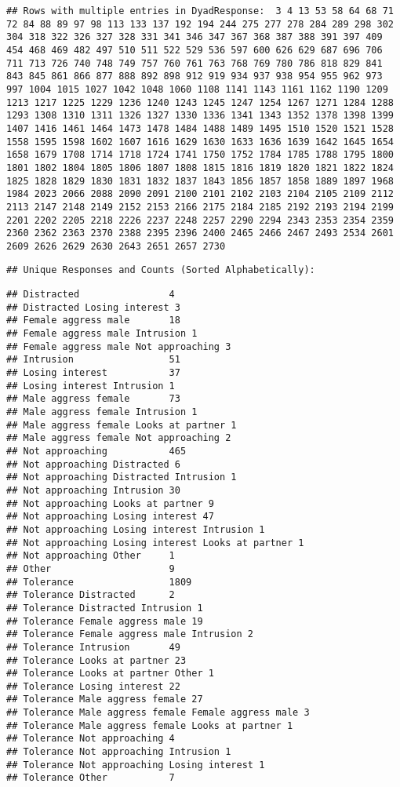\documentclass[
]{article}
\begin{document}
\begin{verbatim}
## Rows with multiple entries in DyadResponse:  3 4 13 53 58 64 68 71 72 84 88 89 97 98 113 133 137 192 194 244 275 277 278 284 289 298 302 304 318 322 326 327 328 331 341 346 347 367 368 387 388 391 397 409 454 468 469 482 497 510 511 522 529 536 597 600 626 629 687 696 706 711 713 726 740 748 749 757 760 761 763 768 769 780 786 818 829 841 843 845 861 866 877 888 892 898 912 919 934 937 938 954 955 962 973 997 1004 1015 1027 1042 1048 1060 1108 1141 1143 1161 1162 1190 1209 1213 1217 1225 1229 1236 1240 1243 1245 1247 1254 1267 1271 1284 1288 1293 1308 1310 1311 1326 1327 1330 1336 1341 1343 1352 1378 1398 1399 1407 1416 1461 1464 1473 1478 1484 1488 1489 1495 1510 1520 1521 1528 1558 1595 1598 1602 1607 1616 1629 1630 1633 1636 1639 1642 1645 1654 1658 1679 1708 1714 1718 1724 1741 1750 1752 1784 1785 1788 1795 1800 1801 1802 1804 1805 1806 1807 1808 1815 1816 1819 1820 1821 1822 1824 1825 1828 1829 1830 1831 1832 1837 1843 1856 1857 1858 1889 1897 1968 1984 2023 2066 2088 2090 2091 2100 2101 2102 2103 2104 2105 2109 2112 2113 2147 2148 2149 2152 2153 2166 2175 2184 2185 2192 2193 2194 2199 2201 2202 2205 2218 2226 2237 2248 2257 2290 2294 2343 2353 2354 2359 2360 2362 2363 2370 2388 2395 2396 2400 2465 2466 2467 2493 2534 2601 2609 2626 2629 2630 2643 2651 2657 2730
\end{verbatim}

\begin{verbatim}
## Unique Responses and Counts (Sorted Alphabetically):
\end{verbatim}

\begin{verbatim}
## Distracted                4
## Distracted Losing interest 3
## Female aggress male       18
## Female aggress male Intrusion 1
## Female aggress male Not approaching 3
## Intrusion                 51
## Losing interest           37
## Losing interest Intrusion 1
## Male aggress female       73
## Male aggress female Intrusion 1
## Male aggress female Looks at partner 1
## Male aggress female Not approaching 2
## Not approaching           465
## Not approaching Distracted 6
## Not approaching Distracted Intrusion 1
## Not approaching Intrusion 30
## Not approaching Looks at partner 9
## Not approaching Losing interest 47
## Not approaching Losing interest Intrusion 1
## Not approaching Losing interest Looks at partner 1
## Not approaching Other     1
## Other                     9
## Tolerance                 1809
## Tolerance Distracted      2
## Tolerance Distracted Intrusion 1
## Tolerance Female aggress male 19
## Tolerance Female aggress male Intrusion 2
## Tolerance Intrusion       49
## Tolerance Looks at partner 23
## Tolerance Looks at partner Other 1
## Tolerance Losing interest 22
## Tolerance Male aggress female 27
## Tolerance Male aggress female Female aggress male 3
## Tolerance Male aggress female Looks at partner 1
## Tolerance Not approaching 4
## Tolerance Not approaching Intrusion 1
## Tolerance Not approaching Losing interest 1
## Tolerance Other           7
\end{verbatim}
\end{document}
